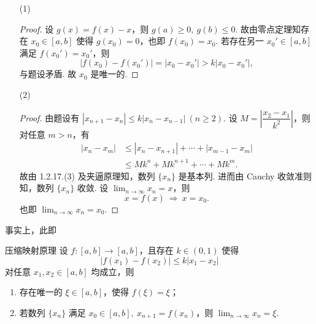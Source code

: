 \begin{enumerate}
    \item[(1)]
    \begin{proof}
        设 $g(x) = f(x) - x$，则 $g(a) \geqslant 0,\ g(b) \leqslant 0$. 故由零点定理知存在 $x_0 \in [a, b]$ 使得 $g(x_0) = 0$，也即 $f(x_0) = x_0$. 若存在另一 $x_0' \in [a, b]$ 满足 $f(x_0') = x_0'$，则
        \[
            |f(x_0) - f(x_0')| = |x_0 - x_0'| > k|x_0 - x_0'|,
        \]
        与题设矛盾. 故 $x_0$ 是唯一的.
    \end{proof}
    \item[(2)]
    \begin{proof}
        由题设有 $|x_{n+1} - x_n| \leqslant k|x_n - x_{n-1}| \ (n \geqslant 2)$. 设 $M = \left| \dfrac{x_2 - x_1}{k^2} \right|$，则对任意 $m > n$，有
        \begin{align*}
            |x_n - x_m| &\leqslant |x_n - x_{n+1}| + \cdots + |x_{m-1} - x_m| \\
            &\leqslant M k^n + M k^{n+1} + \cdots + M k^m.
        \end{align*}
        故由 1.2.17.(3) 及夹逼原理知，数列 $\{ x_n \}$ 是基本列. 进而由 Cauchy 收敛准则知，数列 $\{ x_n \}$ 收敛. 设 $\lim_{n \to \infty} x_n = x$，则
        \[
            x = f(x) \ \Rightarrow \ x = x_0.
        \]
        也即 $\lim_{n \to \infty} x_n = x_0$.
    \end{proof}
\end{enumerate}

事实上，此即

\begin{center}
    \begin{minipage}{0.85\textwidth}
        \begin{theorem}{压缩映射原理}{}
            设 $f: [a, b] \to [a, b]$，且存在 $k \in (0, 1)$ 使得
            \[
                |f(x_1) - f(x_2)| \leqslant k|x_1 - x_2|
            \]
            对任意 $x_1, x_2 \in [a, b]$ 均成立，则
            \begin{enumerate}[label=\arabic*$^\circ$]
                \item
                存在唯一的 $\xi \in [a, b]$，使得 $f(\xi) = \xi$；
                \item
                若数列 $\{ x_n \}$ 满足 $x_0 \in [a, b],\ x_{n+1} = f(x_n)$，则 $\lim_{n \to \infty} x_n = \xi$.
            \end{enumerate}
        \end{theorem}
    \end{minipage}
\end{center}

